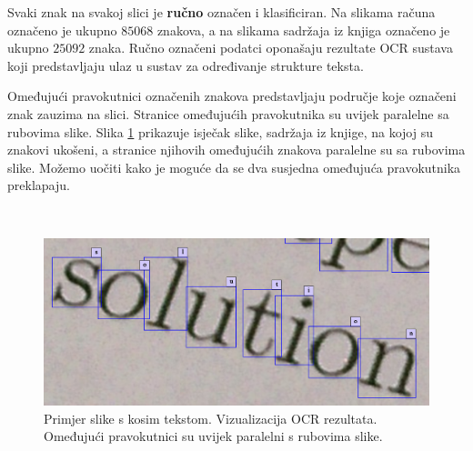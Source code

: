 \documentclass[times, utf8, zavrsni]{fer}
\begin{document}
Svaki znak na svakoj slici je \textbf{ručno} označen i klasificiran. Na slikama računa
označeno je ukupno $85068$ znakova, a na slikama sadržaja iz knjiga označeno je ukupno
$25092$ znaka. Ručno označeni podatci oponašaju rezultate OCR sustava koji predstavljaju ulaz u
sustav za određivanje strukture teksta.

Omeđujući pravokutnici označenih znakova predstavljaju područje koje označeni znak
zauzima na slici. Stranice omeđujućih pravokutnika su uvijek paralelne sa rubovima slike.
Slika \ref{fig:book-example-04} prikazuje isječak slike, sadržaja iz knjige, na kojoj
su znakovi ukošeni, a stranice njihovih omeđujućih znakova paralelne su sa rubovima slike.
Možemo uočiti kako je moguće da se dva susjedna omeđujuća pravokutnika preklapaju.

\

\begin{figure}[htb]
    \centering
    \captionsetup{justification=centering,margin=2cm}
    \includegraphics[width=\textwidth]{images/book-example-04.png}
    \caption{Primjer slike s kosim tekstom. Vizualizacija OCR rezultata. Omeđujući pravokutnici su uvijek paralelni s rubovima slike.}
    \label{fig:book-example-04}
\end{figure}
\end{document}
